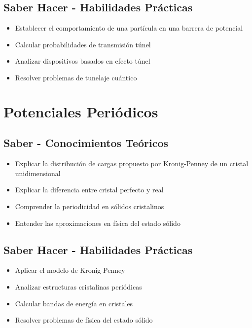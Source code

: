 \documentclass[12pt,a4paper,twoside]{book}
\begin{document}
	\subsection{Saber Hacer - Habilidades Prácticas}
	\begin{hacerbox}
		\begin{itemize}
			\item Establecer el comportamiento de una partícula en una barrera de potencial
			\item Calcular probabilidades de transmisión túnel
			\item Analizar dispositivos basados en efecto túnel
			\item Resolver problemas de tunelaje cuántico
		\end{itemize}
	\end{hacerbox}
	
	\section{Potenciales Periódicos}
	\label{sec:potenciales_periodicos}
	
	\subsection{Saber - Conocimientos Teóricos}
	\begin{saberbox}
		\begin{itemize}
			\item Explicar la distribución de cargas propuesto por Kronig-Penney de un cristal unidimensional
			\item Explicar la diferencia entre cristal perfecto y real
			\item Comprender la periodicidad en sólidos cristalinos
			\item Entender las aproximaciones en física del estado sólido
		\end{itemize}
	\end{saberbox}
	
	\subsection{Saber Hacer - Habilidades Prácticas}
	\begin{hacerbox}
		\begin{itemize}
			\item Aplicar el modelo de Kronig-Penney
			\item Analizar estructuras cristalinas periódicas
			\item Calcular bandas de energía en cristales
			\item Resolver problemas de física del estado sólido
		\end{itemize}
	\end{hacerbox}
	
\end{document}
